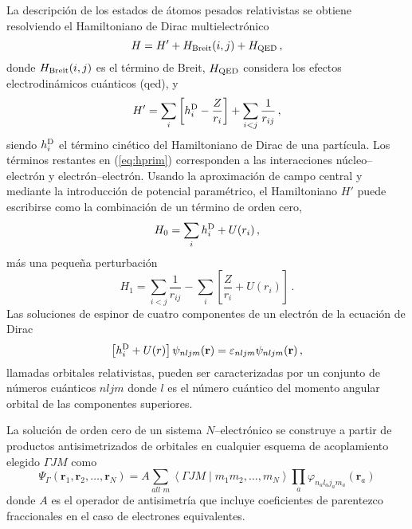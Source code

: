 La descripción de los estados de átomos pesados relativistas se 
obtiene resolviendo el Hamiltoniano de Dirac multielectrónico
\begin{equation}
 H = H' + H_{\mathrm{\mbox{\scriptsize Breit}}}(i,j) +
 H_{\mbox{\scriptsize QED}}\,,
\label{eq:htot}
\end{equation}
donde $H_{\mathrm{\mbox{\scriptsize Breit}}}(i,j)$ es el término de 
Breit, $H_{\mbox{\scriptsize QED}}$ considera los efectos 
electrodinámicos cuánticos (\acs{qed}), y
\begin{equation}
 H' = \sum_i \left[ h_i^{\mbox{\scriptsize D}} - \frac{Z}{r_i}\right]
 + \sum_{i<j}\frac{1}{r_{ij}}\,,
\label{eq:hprim}
\end{equation}
siendo $h_i^{\mbox{\scriptsize D}}$ el término cinético del 
Hamiltoniano de Dirac de una partícula. Los términos restantes en
(\ref{eq:hprim}) corresponden a las interacciones núcleo--electrón y 
electrón--electrón. Usando la aproximación de campo central y mediante 
la introducción de potencial paramétrico, el Hamiltoniano $H'$ puede 
escribirse como la combinación de un término de orden cero, 
\begin{equation}
 H_0 = \sum_i h_i^{\mbox{\scriptsize D}} + U(r_i)\,,
\end{equation}
más una pequeña perturbación
\begin{equation}
 H_1 = \sum_{i<j}\frac{1}{r_{ij}}
 - \sum_i \left[ \frac{Z}{r_i} + U(r_i) \right]\,.
\end{equation}
Las soluciones de espinor de cuatro componentes de un electrón de la 
ecuación de Dirac
\begin{equation}
\left[ h_i^{\mbox{\scriptsize D}} +U(r) \right] \psi_{nljm}(\mathbf{r}) 
= \varepsilon_{nljm} \psi_{nljm}(\mathbf{r})\,,
\end{equation}
llamadas orbitales relativistas, pueden ser caracterizadas por un 
conjunto de números cuánticos $nljm$ donde $l$ es el número cuántico 
del momento angular orbital de las componentes superiores. 

La solución de orden cero de un sistema $N$--electrónico se construye a 
partir de productos antisimetrizados de orbitales en cualquier esquema 
de acoplamiento elegido $\Gamma JM$ como
\begin{equation}
\Psi_{\Gamma}\left(\mathbf{r}_1, \mathbf{r}_2, \ldots, \mathbf{r}_N\right)=A \sum_{all\,\,m}\left\langle\Gamma J M \mid m_1 m_2, \ldots, m_{N}\right\rangle \prod_{a} \varphi_{n_a l_a j_a m_a}\left(\mathbf{r}_a\right)
\end{equation}
donde $A$ es el operador de antisimetría que incluye coeficientes de 
parentezco fraccionales en el caso de electrones equivalentes.

